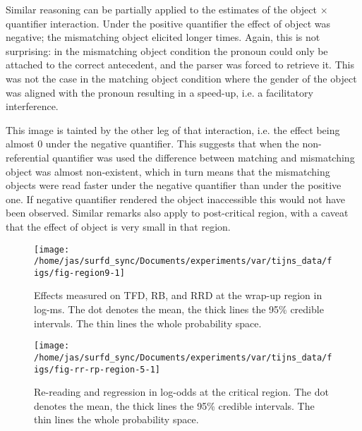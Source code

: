 Similar reasoning can be partially applied to the estimates of the object $\times$ quantifier interaction.
Under the positive quantifier the effect of object was negative; the mismatching object elicited longer times. Again, this is not surprising: in the mismatching object condition the pronoun could only be attached to the correct antecedent, and the parser was forced to retrieve it. This was not the case in the matching object condition where the gender of the object was aligned with the pronoun resulting in a speed-up, i.e. a facilitatory interference.

This image is tainted by the other leg of that interaction, i.e. the effect being almost 0 under the negative quantifier. This suggests that when the non-referential quantifier was used the difference between matching and mismatching object was almost non-existent, which in turn means that the mismatching objects were read faster under the negative quantifier than under the positive one. If negative quantifier rendered the object inaccessible this would not have been observed.
Similar remarks also apply to post-critical region, with a caveat that the effect of object is very small in that region.


\begin{knitrout}
\color{fgcolor}\begin{figure}
\texttt{[image: /home/jas/surfd\_sync/Documents/experiments/var/tijns\_data/figs/fig-region9-1]} \caption{\label{fig:region9-rb-tfd}Effects measured on TFD, RB, and RRD  at the wrap-up region in log-ms. The dot denotes the mean, the thick lines the 95\% credible intervals. The thin lines the whole probability space.}\label{fig:fig-region9}
\end{figure}

\end{knitrout}

\begin{knitrout}
\color{fgcolor}\begin{figure}
\texttt{[image: /home/jas/surfd\_sync/Documents/experiments/var/tijns\_data/figs/fig-rr-rp-region-5-1]} \caption{\label{fig:r5-rr-rp}Re-reading and regression in log-odds at the critical region. The dot denotes the mean, the thick lines the 95\% credible intervals. The thin lines the whole probability space.}\label{fig:fig-rr-rp-region-5}
\end{figure}

\end{knitrout}

